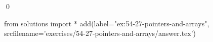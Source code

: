 
\begin{ex}
  \label{ex:54-27-pointers-and-arrays}
  
  \qed
\end{ex}
\begin{python0}
from solutions import *
add(label="ex:54-27-pointers-and-arrays",
    srcfilename='exercises/54-27-pointers-and-arrays/answer.tex')
\end{python0}
